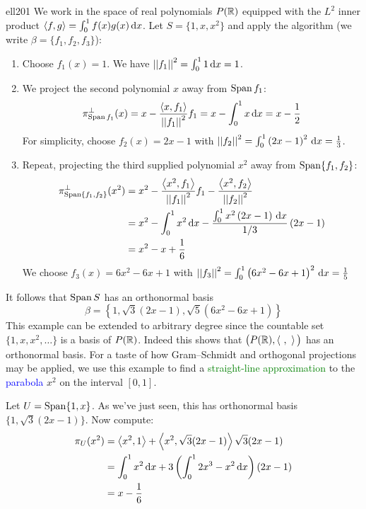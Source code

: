 \begin{example}{}{ell201}
	We work in the space of real polynomials $P(\mathbb{R})$ equipped with the $L^2$ inner product $\left\langle f,g\right\rangle=\int_0^1f(x)g(x)\,{\mathrm{d} x}$. Let $S=\{1,x,x^2\}$ and apply the algorithm (we write $\beta=\{f_1,f_2,f_3\}$):
	\begin{enumerate}
		\item Choose $f_1(x)=1$. We have $\left| \left| f_1\right|\right|^2=\int_0^11\,{\mathrm{d} x}=1$.
		\item We project the second polynomial $x$ away from $\operatorname{Span} f_1$:
		\[
			\pi_{\operatorname{Span} f_1}^\perp(x)
			=x-\frac{\left\langle x,f_1\right\rangle}{\left| \left| f_1\right|\right|^2}f_1
			=x-\int_0^1x\,{\mathrm{d} x} 
			=x-\frac 12
		\]
		For simplicity, choose $f_2(x)=2x-1$ with $\left| \left| f_2\right|\right|^2=\int_0^1\left(2x-1\right)^2\,{\mathrm{d} x}=\frac 13$.
		\item	Repeat, projecting the third supplied polynomial $x^2$ away from $\operatorname{Span}\{ f_1,f_2\}$:
		\begin{align*}
			\pi_{\operatorname{Span}\{f_1,f_2\}}^\perp(x^2) 
			&=x^2-\frac{\left\langle x^2,f_1\right\rangle}{\left| \left| f_1\right|\right|^2}f_1-\frac{\left\langle x^2,f_2\right\rangle}{\left| \left| f_2\right|\right|^2}\\
			&=x^2-\int_0^1x^2\,{\mathrm{d} x}-\frac{\int_0^1x^2\left(2x-1\right)\,{\mathrm{d} x}}{1/3}\left(2x-1\right)\\
			&=x^2-x+\frac 16
		\end{align*}
		We choose $f_3(x)=6x^2-6x+1$ with $\left| \left| f_3\right|\right|^2=\int_0^1\left(6x^2-6x+1\right)^2\,{\mathrm{d} x}=\frac 1{5}$
	\end{enumerate}
	It follows that $\operatorname{Span} S$ has an orthonormal basis
	\[
		\beta=\left\{1,\sqrt 3(2x-1),\sqrt 5(6x^2-6x+1)\right\}
	\]
	This example can be extended to arbitrary degree since the countable set $\{1,x,x^2,\ldots\}$ is a basis of $P(\mathbb{R})$. Indeed this shows that $\big(P(\mathbb{R}),\left\langle \ ,\ \right\rangle\big)$ has an orthonormal basis.\bigbreak
	For a taste of how Gram--Schmidt and orthogonal projections may be applied, we use this example to find  a \textcolor{Green}{straight-line approximation} to the \textcolor{blue}{parabola} $x^2$ on the interval $[0,1]$.\par
	\begin{minipage}[t]{0.67\linewidth}\vspace{-4pt}
		Let $U=\operatorname{Span}\{1,x\}$. As we've just seen, this has orthonormal basis $\big\{1,\sqrt 3(2x-1)\big\}$. Now compute:
		\begin{align*}
		 	\pi_U(x^2)
		 	&=\left\langle x^2,1\right\rangle +\left\langle x^2,\sqrt 3(2x-1)\right\rangle\sqrt 3(2x-1)\\
		 	&=\int_0^1x^2\,{\mathrm{d} x} +3\left(\int_0^12x^3-x^2\,{\mathrm{d} x}\right)(2x-1)\\
		 	&=x-\frac 16
		\end{align*}

\end{minipage}
\end{example}
